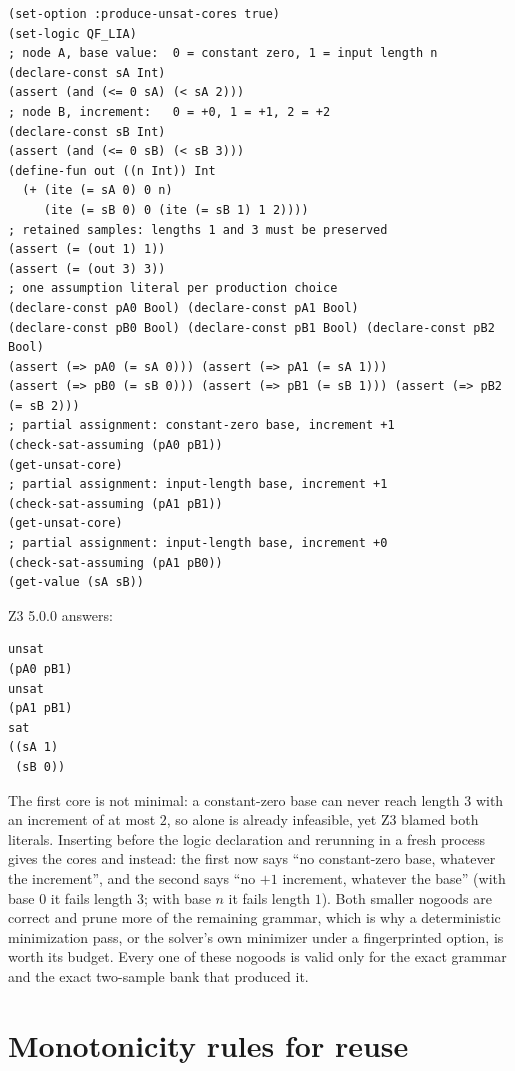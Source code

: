 \documentclass[10pt,letterpaper,oneside]{report}
\newcommand{\code}[1]{\texttt{\detokenize{#1}}}
\begin{document}
\begin{lstlisting}[language=SMTLib,caption={Assumption literals per production choice, and cores over them.}]
(set-option :produce-unsat-cores true)
(set-logic QF_LIA)
; node A, base value:  0 = constant zero, 1 = input length n
(declare-const sA Int)
(assert (and (<= 0 sA) (< sA 2)))
; node B, increment:   0 = +0, 1 = +1, 2 = +2
(declare-const sB Int)
(assert (and (<= 0 sB) (< sB 3)))
(define-fun out ((n Int)) Int
  (+ (ite (= sA 0) 0 n)
     (ite (= sB 0) 0 (ite (= sB 1) 1 2))))
; retained samples: lengths 1 and 3 must be preserved
(assert (= (out 1) 1))
(assert (= (out 3) 3))
; one assumption literal per production choice
(declare-const pA0 Bool) (declare-const pA1 Bool)
(declare-const pB0 Bool) (declare-const pB1 Bool) (declare-const pB2 Bool)
(assert (=> pA0 (= sA 0))) (assert (=> pA1 (= sA 1)))
(assert (=> pB0 (= sB 0))) (assert (=> pB1 (= sB 1))) (assert (=> pB2 (= sB 2)))
; partial assignment: constant-zero base, increment +1
(check-sat-assuming (pA0 pB1))
(get-unsat-core)
; partial assignment: input-length base, increment +1
(check-sat-assuming (pA1 pB1))
(get-unsat-core)
; partial assignment: input-length base, increment +0
(check-sat-assuming (pA1 pB0))
(get-value (sA sB))
\end{lstlisting}

Z3 5.0.0 answers:

\begin{lstlisting}[language=SMTLib]
unsat
(pA0 pB1)
unsat
(pA1 pB1)
sat
((sA 1)
 (sB 0))
\end{lstlisting}

The first core is not minimal: a constant-zero base can never reach length $3$ with an increment of at most $2$, so \code{pA0} alone is already infeasible, yet Z3 blamed both literals. Inserting \code{(set-option :smt.core.minimize true)} before the logic declaration and rerunning in a fresh process gives the cores \code{(pA0)} and \code{(pB1)} instead: the first now says ``no constant-zero base, whatever the increment'', and the second says ``no $+1$ increment, whatever the base'' (with base $0$ it fails length $3$; with base $n$ it fails length $1$). Both smaller nogoods are correct and prune more of the remaining grammar, which is why a deterministic minimization pass, or the solver's own minimizer under a fingerprinted option, is worth its budget. Every one of these nogoods is valid only for the exact grammar and the exact two-sample bank that produced it.


\section{Monotonicity rules for reuse}
\end{document}
